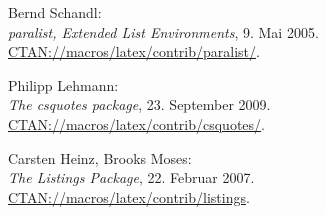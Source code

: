 \documentclass{exercise}
\begin{document}
\begin{thebibliography}{22}
     Bernd Schandl: \\
    \emph{paralist, Extended List Environments}, 9. Mai 2005. \\
    \href{http://mirror.ctan.org/macros/latex/contrib/paralist/}{CTAN://macros/latex/contrib/paralist/}.
    
     Philipp Lehmann: \\
    \emph{The csquotes package}, 23. September 2009. \\
    \href{http://mirror.ctan.org/macros/latex/contrib/csquotes/}{CTAN://macros/latex/contrib/csquotes/}.
    
     Carsten Heinz, Brooks Moses: \\
    \emph{The Listings Package}, 22. Februar 2007. \\
    \href{http://mirror.ctan.org/macros/latex/contrib/listings}{CTAN://macros/latex/contrib/listings}.
    
  \end{thebibliography}  
\end{document}

